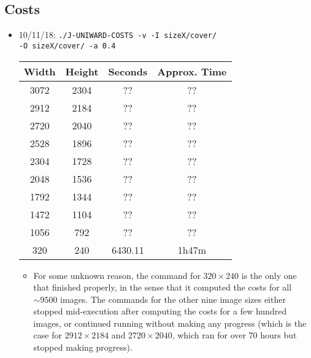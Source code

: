 \documentclass[11pt,a4paper]{report}
\begin{document}
\subsection{Costs}
\begin{itemize}
\item 10/11/18: \texttt{./J-UNIWARD-COSTS -v -I sizeX/cover/} \\
         \texttt{-O sizeX/cover/ -a 0.4}
  \begin{center}
  \begin{tabular}{ c c | c c }
  Width & Height & Seconds & Approx. Time \\ \hline
  3072 & 2304 & ?? & ?? \\  %
  2912 & 2184 & ?? & ?? \\  %
  2720 & 2040 & ?? & ?? \\  %
  2528 & 1896 & ?? & ?? \\  %
  2304 & 1728 & ?? & ?? \\  %
  2048 & 1536 & ?? & ?? \\  %
  1792 & 1344 & ?? & ?? \\  %
  1472 & 1104 & ?? & ?? \\  %
  1056 & 792 & ?? & ?? \\  %
  320 & 240 & 6430.11 & 1h47m \\
  \end{tabular}
  \end{center}

  \begin{itemize}
  \item For some unknown reason, the command for $320 \times 240$ is the only one that finished properly, in the sense that it computed the costs for all $\sim 9500$ images. The commands for the other nine image sizes either stopped mid-execution after computing the costs for a few hundred images, or continued running without making any progress (which is the case for $2912 \times 2184$ and $2720 \times 2040$, which ran for over 70 hours but stopped making progress).
  \end{itemize}


\end{itemize}
\end{document}

